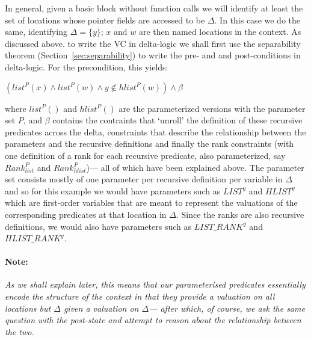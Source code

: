 \documentclass[acmsmall,review,anonymous]{acmart}\settopmatter{printfolios=true,printccs=false,printacmref=false}
\begin{document}
In general, given a basic block without function calls we will identify at least the set of locations whose pointer fields are accessed to be $\Delta{}$. In this case we do the same, identifying $\Delta{} = \{y\}$; $x$ and $w$ are then named locations in the context. As discussed above. to write the VC in delta-logic we shall first use the separability theorem (Section~\ref{sec:separability}) to write the pre- and and post-conditions in delta-logic. For the precondition, this yields:
\begin{center}
 $\left(list^{P}(x) \wedge  list^{P}(w) \wedge  y \not \in hlist^{P}(w)\right) \land{} \beta{}$
\end{center}
where $list^{P}()$ and $hlist^{P}()$ are the parameterized versions with the parameter set $P$, and $\beta{}$ contains the contraints that `unroll' the definition of these recursive predicates across the delta, constraints that describe the relationship between the parameters and the recursive definitions and finally the rank constraints (with one definition of a rank for each recursive predicate, also parameterized, say $Rank^{P}_{list}$ and $Rank^{P}_{hlist}$)--- all of which have been explained above. The parameter set consists mostly of one parameter per recursive definition per variable in $\Delta{}$ and so for this example we would have parameters such as $LIST^{y}$ and $HLIST^{y}$ which are first-order variables that are meant to represent the valuations of the corresponding predicates at that location in $\Delta{}$. Since the ranks are also recursive definitions, we would also have parameters such as $LIST\_RANK^{y}$ and $HLIST\_RANK^{y}$.

\paragraph{Note:} \emph{As we shall explain later, this means that our parameterised predicates essentially encode the structure of the context in that they provide a valuation on all locations but $\Delta{}$ given a valuation on $\Delta{}$--- after which, of course, we ask the same question with the post-state and attempt to reason about the relationship between the two.}
\end{document}
